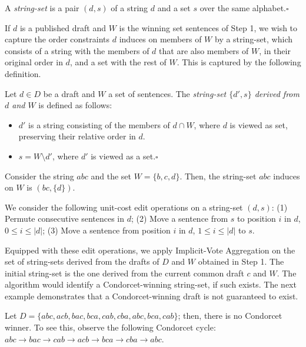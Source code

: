\documentclass[sigconf]{aamas}  %
\newcommand{\qqed}{\hfill$\square$}
\begin{document}
\begin{definition}
  A \emph{string-set} is a pair
  $(d, s)$
  of a string $d$ 
  and a set $s$ over the same alphabet.\qqed
\end{definition}

If $d$ is a published draft and $W$ is the winning set sentences of Step 1, we wish to capture the order constraints $d$ induces on members of $W$ by a string-set, which consists of a string with the members of $d$ that are also members of $W$, in their original order in $d$, and a set with the rest of $W$. This is captured by the following definition.

\begin{definition}
Let $d \in D$ be a draft and $W$ a set of sentences.
The \emph{string-set $\{d',s\}$ derived from $d$ and $W$} is defined as follows:
\begin{itemize}

\item
$d'$ is a string consisting of the members of $d \cap W$, where $d$ is viewed as set, preserving their relative order in $d$.

\item
$s = W \setminus d'$, where $d'$ is viewed as a set.\qqed

\end{itemize}
%
\end{definition}

\begin{example}
%
Consider the string $abc$ and the set $W = \{b, c, d\}$.
Then, the string-set $abc$ induces on $W$ is  $(bc,\{d\})$.
%
\end{example}

We consider the following unit-cost edit operations on a string-set $(d,s)$:
(1) Permute consecutive sentences in $d$;
(2) Move a sentence from $s$ to position $i$ in $d$, $0 \le i \le |d|$;
(3) Move a sentence from position $i$ in $d$, $1 \le i \le |d|$ to $s$.

Equipped with these edit operations,
we apply Implicit-Vote Aggregation on the set of string-sets derived from the drafts of $D$ and $W$ obtained in Step 1.  The initial string-set is the one derived from the current common draft $c$ and $W$.  The algorithm would identify a Condorcet-winning string-set, if such exists.
%
The next example demonstrates that a Condorcet-winning draft is not guaranteed to exist.

\begin{example}
%
Let $D = \{abc, acb, bac, bca, cab, cba, abc, bca, cab\}$; then, there is no Condorcet winner. To see this, observe the following Condorcet cycle: $abc \to bac \to cab \to acb \to bca \to cba \to abc$.
%
\end{example}
\end{document}
